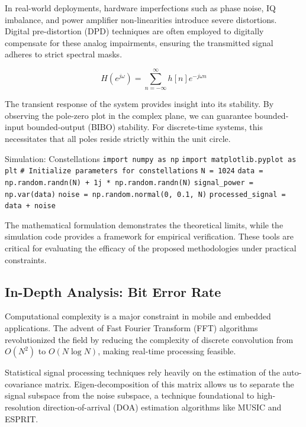 In real-world deployments, hardware imperfections such as phase noise, IQ imbalance, and power amplifier non-linearities introduce severe distortions. Digital pre-distortion (DPD) techniques are often employed to digitally compensate for these analog impairments, ensuring the transmitted signal adheres to strict spectral masks.

\begin{equation}
    H(e^{j\omega}) = \sum_{n=-\infty}^{\infty} h[n] e^{-j\omega n}
\end{equation}

The transient response of the system provides insight into its stability. By observing the pole-zero plot in the complex plane, we can guarantee bounded-input bounded-output (BIBO) stability. For discrete-time systems, this necessitates that all poles reside strictly within the unit circle.

\begin{pythonbox}{Simulation: Constellations}
\texttt{import numpy as np}
\texttt{import matplotlib.pyplot as plt}
\texttt{}
\texttt{\# Initialize parameters for constellations}
\texttt{N = 1024}
\texttt{data = np.random.randn(N) + 1j * np.random.randn(N)}
\texttt{signal\_power = np.var(data)}
\texttt{noise = np.random.normal(0, 0.1, N)}
\texttt{processed\_signal = data + noise}
\end{pythonbox}

\vspace{0.5cm}
The mathematical formulation demonstrates the theoretical limits, while the simulation code provides a framework for empirical verification. These tools are critical for evaluating the efficacy of the proposed methodologies under practical constraints.


\subsection{In-Depth Analysis: Bit Error Rate}
Computational complexity is a major constraint in mobile and embedded applications. The advent of Fast Fourier Transform (FFT) algorithms revolutionized the field by reducing the complexity of discrete convolution from $O(N^2)$ to $O(N \log N)$, making real-time processing feasible.

Statistical signal processing techniques rely heavily on the estimation of the auto-covariance matrix. Eigen-decomposition of this matrix allows us to separate the signal subspace from the noise subspace, a technique foundational to high-resolution direction-of-arrival (DOA) estimation algorithms like MUSIC and ESPRIT.

